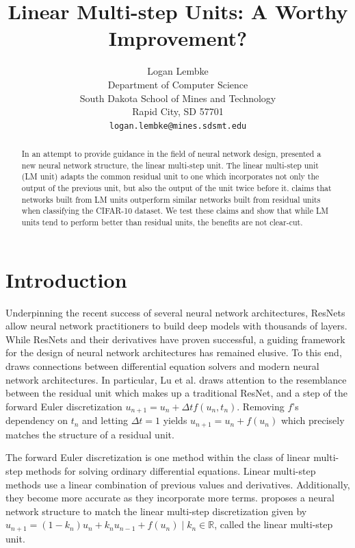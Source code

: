 \documentclass{article}
\title{Linear Multi-step Units: A Worthy Improvement?}
\author{
  Logan Lembke \\
  Department of Computer Science\\
  South Dakota School of Mines and Technology\\
  Rapid City, SD 57701 \\
  \texttt{logan.lembke@mines.sdsmt.edu} \\
}
\begin{document}

\maketitle

\begin{abstract}
  In an attempt to provide guidance in the field of neural network design,
  \citet{Lu} presented a new neural network structure, the linear multi-step unit. 
  The linear multi-step unit (LM unit) adapts the common residual unit to one which
  incorporates not only the output of the previous unit, but also the output of
  the unit twice before it. \citet{Lu} claims that networks built from LM units outperform
  similar networks built from residual units when classifying the CIFAR-10 dataset.
  We test these claims and show that while LM units tend to perform better than
  residual units, the benefits are not clear-cut.
\end{abstract}

\section{Introduction}

Underpinning the recent success of several neural network architectures, ResNets \cite{He} allow
neural network practitioners to build deep models with thousands of layers. While ResNets
and their derivatives have proven successful, a guiding framework for the design of neural
network architectures has remained elusive. To this end, \citet{Lu} draws connections between 
differential equation solvers and modern neural network architectures. In particular, 
Lu et al. draws attention to the resemblance between the residual unit which makes up a 
traditional ResNet, and a step of the forward Euler discretization 
$u_{n+1} = u_n + \Delta t f(u_n, t_n)$. Removing $f$'s dependency on $t_n$ and letting 
$\Delta t = 1$ yields $u_{n+1} = u_n + f(u_n)$ which precisely matches the structure of 
a residual unit. 

The forward Euler discretization is one method within the class of linear multi-step methods
for solving ordinary differential equations. Linear multi-step methods use a linear
combination of previous values and derivatives. Additionally, they become more accurate as they
incorporate more terms. \citet{Lu} proposes a neural network structure to match the linear multi-step
discretization given by $u_{n+1} = (1 - k_n)u_n + k_n u_{n-1} + f(u_n) \mid k_n \in \mathbb{R}$, 
called the linear multi-step unit. 
\end{document}
